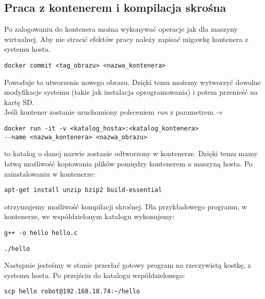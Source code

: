 \documentclass{article}
\begin{document}
\subsection{Praca z kontenerem i kompilacja skrośna}
Po zalogowaniu do kontenera można wykonywać operacje jak dla maszyny wirtualnej. Aby nie stracić efektów pracy należy zapisać migawkę kontenera z systemu hosta.
\begin{lstlisting}
docker commit <tag_obrazu> <nazwa_kontenera> 
\end{lstlisting}
Powoduje to utworzenie nowego obrazu. Dzięki temu możemy wytworzyć dowolne modyfikacje systemu (takie jak instalacja oprogramowania) i potem przenieść na kartę SD.\\
Jeśli kontener zostanie uruchomiony poleceniem \textit{run} z parametrem \textit{-v} 
\begin{lstlisting}
docker run -it -v <katalog_hosta>:<katalog_kontenera> 
--name <nazwa_kontenera> <nazwa_obrazu>
\end{lstlisting}
to katalog o danej nazwie zostanie odtworzony w kontenerze. Dzięki temu mamy łatwą możliwość kopiowania plików pomiędzy kontenerem a maszyną hosta. Po zainstalowaniu w kontenerze:
\begin{lstlisting}
apt-get install unzip bzip2 build-essential
\end{lstlisting}
otrzymujemy możliwość kompilacji skrośnej.
Dla przykładowego programu, w kontenerze, we współdzielonym katalogu wykonujemy:
\begin{lstlisting}
g++ -o hello hello.c
\end{lstlisting}
\begin{lstlisting}
./hello
\end{lstlisting}
Następnie jesteśmy w stanie przesłać gotowy program na rzeczywistą kostkę, z systemu hosta. Po przejściu do katalogu współdzielonego:
\begin{lstlisting}
scp hello robot@192.168.18.74:~/hello
\end{lstlisting}
\end{document}
